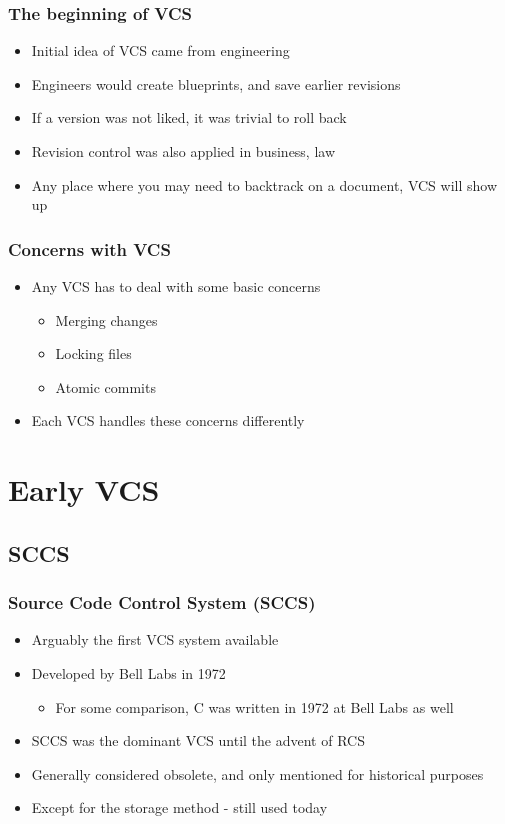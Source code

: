 \documentclass{beamer}
\begin{document}
\begin{frame}
    \frametitle{The beginning of VCS}
    \begin{itemize}
	\item Initial idea of VCS came from engineering
	\item Engineers would create blueprints, and save earlier revisions
	\item If a version was not liked, it was trivial to roll back
	\item Revision control was also applied in business, law
	\item Any place where you may need to backtrack on a document, VCS will show up
    \end{itemize}
\end{frame}

\begin{frame}
    \frametitle{Concerns with VCS}
    \begin{itemize}
	\item Any VCS has to deal with some basic concerns
	\begin{itemize}
	    \item Merging changes
	    \item Locking files
	    \item Atomic commits
	\end{itemize}
	\item Each VCS handles these concerns differently
    \end{itemize}
\end{frame}

\section{Early VCS}

\subsection{SCCS}

\begin{frame}
    \frametitle{Source Code Control System (SCCS)}
    \begin{itemize}
	\item Arguably the first VCS system available
	\item Developed by Bell Labs in 1972
	\begin{itemize}
	    \item For some comparison, C was written in 1972 at Bell Labs as well
	\end{itemize}
	\item SCCS was the dominant VCS until the advent of RCS 
	\item Generally considered obsolete, and only mentioned for historical purposes
	\item Except for the storage method - still used today
    \end{itemize}
\end{frame}
\end{document}
